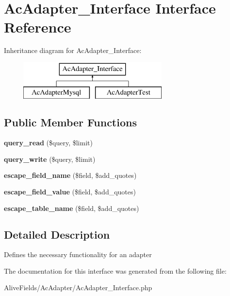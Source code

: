 \hypertarget{interface_ac_adapter___interface}{\section{\-Ac\-Adapter\-\_\-\-Interface \-Interface \-Reference}
\label{interface_ac_adapter___interface}
}
\-Inheritance diagram for \-Ac\-Adapter\-\_\-\-Interface\-:\begin{figure}[H]
\begin{center}
\leavevmode
\includegraphics[height=2.000000cm]{interface_ac_adapter___interface}
\end{center}
\end{figure}
\subsection*{\-Public \-Member \-Functions}
\begin{DoxyCompactItemize}
\item 
\hypertarget{interface_ac_adapter___interface_a984f89a4f777e5429e9319a130c0b507}{{\bfseries query\-\_\-read} (\$query, \$limit)}\label{interface_ac_adapter___interface_a984f89a4f777e5429e9319a130c0b507}

\item 
\hypertarget{interface_ac_adapter___interface_aee04fd16a05463176f3128d93b6d8f1c}{{\bfseries query\-\_\-write} (\$query, \$limit)}\label{interface_ac_adapter___interface_aee04fd16a05463176f3128d93b6d8f1c}

\item 
\hypertarget{interface_ac_adapter___interface_a1b84ed47af972721d0357e7963d96feb}{{\bfseries escape\-\_\-field\-\_\-name} (\$field, \$add\-\_\-quotes)}\label{interface_ac_adapter___interface_a1b84ed47af972721d0357e7963d96feb}

\item 
\hypertarget{interface_ac_adapter___interface_a2f06d5c5727f1c76b01d7ca4ec93e627}{{\bfseries escape\-\_\-field\-\_\-value} (\$field, \$add\-\_\-quotes)}\label{interface_ac_adapter___interface_a2f06d5c5727f1c76b01d7ca4ec93e627}

\item 
\hypertarget{interface_ac_adapter___interface_a7489aab6f91ae9ce527a247432d843bf}{{\bfseries escape\-\_\-table\-\_\-name} (\$field, \$add\-\_\-quotes)}\label{interface_ac_adapter___interface_a7489aab6f91ae9ce527a247432d843bf}

\end{DoxyCompactItemize}


\subsection{\-Detailed \-Description}
\-Defines the necessary functionality for an adapter 

\-The documentation for this interface was generated from the following file\-:\begin{DoxyCompactItemize}
\item 
\-Alive\-Fields/\-Ac\-Adapter/\-Ac\-Adapter\-\_\-\-Interface.\-php\end{DoxyCompactItemize}
